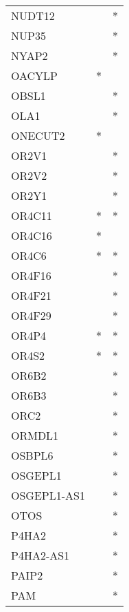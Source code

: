 \begin{longtable}{lcc}
NUDT12          &                &          * \\
NUP35           &                &          * \\
NYAP2           &                &          * \\
OACYLP          &              * &            \\
OBSL1           &                &          * \\
OLA1            &                &          * \\
ONECUT2         &              * &            \\
OR2V1           &                &          * \\
OR2V2           &                &          * \\
OR2Y1           &                &          * \\
OR4C11          &              * &          * \\
OR4C16          &              * &            \\
OR4C6           &              * &          * \\
OR4F16          &                &          * \\
OR4F21          &                &          * \\
OR4F29          &                &          * \\
OR4P4           &              * &          * \\
OR4S2           &              * &          * \\
OR6B2           &                &          * \\
OR6B3           &                &          * \\
ORC2            &                &          * \\
ORMDL1          &                &          * \\
OSBPL6          &                &          * \\
OSGEPL1         &                &          * \\
OSGEPL1-AS1     &                &          * \\
OTOS            &                &          * \\
P4HA2           &                &          * \\
P4HA2-AS1       &                &          * \\
PAIP2           &                &          * \\
PAM             &                &          * \\

\end{longtable}
